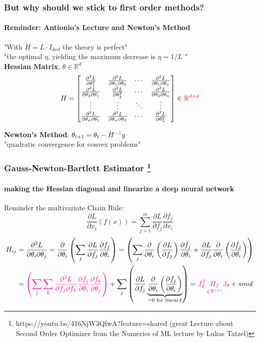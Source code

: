 \documentclass[
	11pt, %
	aspectratio=169, %
]{beamer}
\begin{document}
\begin{frame}
	\frametitle{But why should we stick to first order methods?}
	\framesubtitle{Reminder: Antionio's Lecture and Newton's Method}
		"With $H= L \cdot I_{dxd}$ the theory is perfect" \\
		"the optimal $\eta$, yielding the maximum decrease is $\eta = 1/L$ "\\
		\vspace{1em}
		\textbf{{Hessian Matrix}}, $\theta \in \mathbb{R}^d$
\[
H = \begin{bmatrix}
\frac{\partial^2 L}{\partial \theta_1^2} & \frac{\partial^2 L}{\partial \theta_1 \partial \theta_2} & \cdots & \frac{\partial^2 L}{\partial \theta_1 \partial \theta_n} \\
\frac{\partial^2 L}{\partial \theta_2 \partial \theta_1} & \frac{\partial^2 L}{\partial \theta_2^2} & \cdots & \frac{\partial^2 L}{\partial \theta_2 \partial \theta_n} \\
\vdots & \vdots & \ddots & \vdots \\
\frac{\partial^2 L}{\partial \theta_n \partial \theta_1} & \frac{\partial^2 L}{\partial \theta_n \partial \theta_2} & \cdots & \frac{\partial^2 L}{\partial \theta_n^2}
\end{bmatrix} \in \textcolor{red}{\mathbb{R}^{d\times d}}
\]

		\textbf{Newton's Method}: $\theta_{t+1} = \theta_t - H^{\textcolor{red}{-1}} g$\\
		"quadratic convergence for convex problems"

\end{frame}

\begin{frame}
	\frametitle{Gauss-Newton-Bartlett Estimator \footnote{https://youtu.be/416NjW3QfwA?feature=shared (great Lecture about Second Order Optimizer from the Numerics of ML lecture by Lukas Tatzel)}}
	\framesubtitle{making the Hessian diagonal and linearize a deep neural network}
	Reminder the multivariate Chain Rule:\[
\frac{\partial L}{\partial x_i}(f(x)) = \sum_{j=1}^m \frac{\partial L}{\partial f_j} \frac{\partial f_j}{\partial x_i}
\]
				 \begin{align*}
					H_{ij} &= \frac{\partial^2 L}{\partial \theta_i \partial \theta_j} =\frac{\partial}{\partial \theta_i }\left( \sum_j \frac{\partial L}{\partial f_j} \frac{\partial f_j}{\partial \theta_i}  \right) 
				 =\left( \sum_j \frac{\partial}{\partial \theta_i } \left(\frac{\partial L}{\partial f_j}\right) \frac{\partial f_j}{\partial \theta_i} +    \frac{\partial L}{\partial f_j} \frac{\partial}{\partial \theta_i }\left( \frac{\partial f_j}{\partial \theta_i}\right) \right) \\
				 &=\textcolor{magenta}{\left( \sum_j \sum_k \frac{\partial^2 L }{\partial f_j \partial f_k }  \frac{\partial f_j}{\partial \theta_i} \frac{\partial f_k}{\partial \theta_j}\right)}+ \sum_j \left(  \frac{\partial L}{\partial f_j} \underbrace{\frac{\partial}{\partial \theta_i }\left( \frac{\partial f_j}{\partial \theta_i}\right)}_{=0 \text{ for linear}f} \right)  = \textcolor{magenta}{J_\theta^T \underset{\in \mathbb{R}^{c\times c}}{H_f} J_\theta} +  smol
				 \end{align*}
\end{frame}
 
\end{document}
